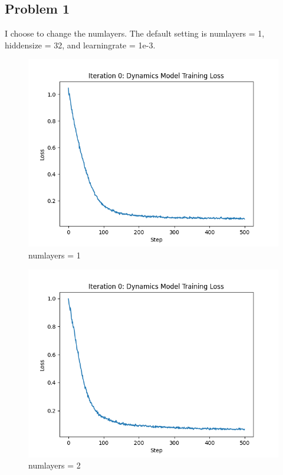\documentclass[10pt]{report}
\begin{document}
\subsection*{Problem 1}
I choose to change the num\textunderscore layers. The default setting is num\textunderscore layers = 1, hidden\textunderscore size = 32, and learning\textunderscore rate = 1e-3.
\begin{figure}[h]
	\includegraphics[width=\textwidth]{figures/Problem 1/itr_0_loss_curve_numlayers_1.png}
	\caption{num\textunderscore layers = 1}
\end{figure}
\newpage
\begin{figure}[h]
	\includegraphics[width=\textwidth]{figures/Problem 1/itr_0_loss_curve_numlayers_2.png}
	\caption{num\textunderscore layers = 2}
\end{figure}
\end{document}
